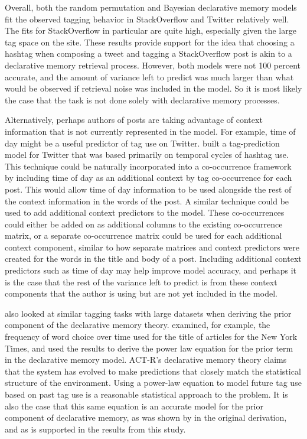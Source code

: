 \documentclass[man,floatsintext,donotrepeattitle]{apa6}
\begin{document}
Overall, both the random permutation and Bayesian declarative memory models fit the observed tagging behavior in StackOverflow and Twitter relatively well.
The fits for StackOverflow in particular are quite high, especially given the large tag space on the site.
These results provide support for the idea that choosing a hashtag when composing a tweet and tagging a StackOverflow post is akin to a declarative memory retrieval process.
However, both models were not 100 percent accurate, and the amount of variance left to predict was much larger than what would be observed if retrieval noise was included in the model.
So it is most likely the case that the task is not done solely with declarative memory processes.

Alternatively, perhaps authors of posts are taking advantage of context information that is not currently represented in the model.
For example, time of day might be a useful predictor of tag use on Twitter.
\textcite{Cohn2012} built a tag-prediction model for Twitter that was based primarily on temporal cycles of hashtag use.
This technique could be naturally incorporated into a co-occurrence framework by including time of day as an additional context by tag co-occurrence for each post.
This would allow time of day information to be used alongside the rest of the context information in the words of the post.
A similar technique could be used to add additional context predictors to the model.
These co-occurrences could either be added on as additional columns to the existing co-occurrence matrix,
or a separate co-occurrence matrix could be used for each additional context component, similar to how separate matrices and context predictors were created for the words in the title and body of a post. 
Including additional context predictors such as time of day may help improve model accuracy,
and perhaps it is the case that the rest of the variance left to predict is from these context components that the author is using but are not yet included in the model.

\textcite{Anderson1991} also looked at similar tagging tasks with large datasets when deriving the prior component of the declarative memory theory.
\citeauthor{Anderson1991} examined, for example, the frequency of word choice over time used for the title of articles for the New York Times,
and used the results to derive the power law equation for the prior term in the declarative memory model.
ACT-R's declarative memory theory claims that the system has evolved to make predictions that closely match the statistical structure of the environment.
Using a power-law equation to model future tag use based on past tag use is a reasonable statistical approach to the problem.
It is also the case that this same equation is an accurate model for the prior component of declarative memory, as was shown by \citeauthor{Anderson1991} in the original derivation, 
and as is supported in the results from this study.
\end{document}
